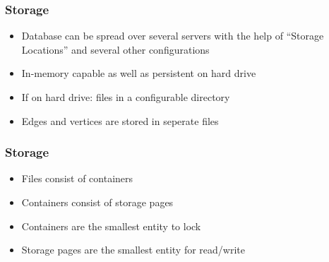 
\begin{frame}
\frametitle{Storage}
\begin{itemize}
\item Database can be spread over several servers with the help of "`Storage Locations"' and several other configurations
\item In-memory capable as well as persistent on hard drive
\item If on hard drive: files in a configurable directory
\item Edges and vertices are stored in seperate files
\end{itemize}
\end{frame}

\begin{frame}
\frametitle{Storage}
\begin{itemize}
\item Files consist of containers
\item Containers consist of storage pages
\item Containers are the smallest entity to lock
\item Storage pages are the smallest entity for read/write
\end{itemize}
\end{frame} 
